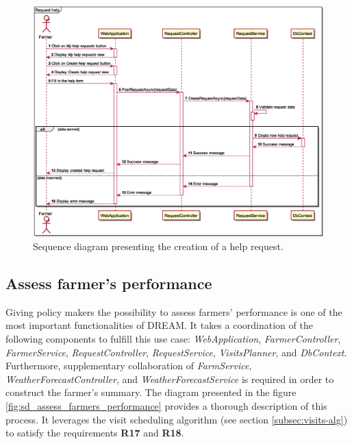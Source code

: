 \begin{figure}
    \centering
    \includegraphics[height=\textheight, width=\textwidth, keepaspectratio, origin=c]{diagrams/sequence/request_help}
    \caption{Sequence diagram presenting the creation of a help request.}
    \label{fig:sd_request_help}
\end{figure}

\subsection*{Assess farmer's performance}

Giving policy makers the possibility to assess farmers' performance is one of the most important functionalities of DREAM. It takes a coordination of the following components to fulfill this use case: \textit{WebApplication}, \textit{FarmerController}, \textit{FarmerService}, \textit{RequestController}, \textit{RequestService}, \textit{VisitsPlanner}, and \textit{DbContext}. Furthermore, supplementary collaboration of \textit{FarmService}, \textit{WeatherForecastController}, and \textit{WeatherForecastService} is required in order to construct the farmer's summary. The diagram presented in the figure \ref{fig:sd_assess_farmers_performance} provides a thorough description of this process. It leverages the visit scheduling algorithm (see section \ref{subsec:visits-alg}) to satisfy the requirements \textbf{R17} and \textbf{R18}.

